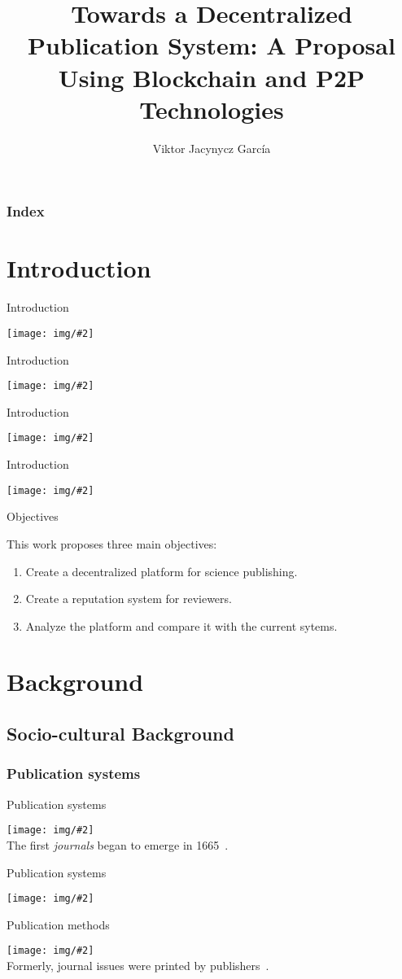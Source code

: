 \documentclass{beamer}
\title[Towards a Decentralized Publication System]{\large{Towards a Decentralized Publication System: A Proposal Using Blockchain and P2P Technologies}}
\author[V. Jacynycz]{Viktor Jacynycz García}
\institute[UCM] %
{
  Máster en ingeniería informática \\
  Master’s degree in Computer Science Engineering \\
  Facultad de informática\\
  Universidad Complutense de Madrid \\ %
  \medskip
  \textit{vsjg@ucm.es} %
}
\date{} %
\newcommand{\frameitc}[4]{
  \begin{frame}{#1}
    \begin{center}
      \texttt{[image: img/\#2]}\\
      #3~\cite{#4}.
    \end{center}
  \end{frame}
}
\newcommand{\framei}[2]{
  \begin{frame}{#1}
    \begin{center}
      \texttt{[image: img/\#2]}
    \end{center}
  \end{frame}
}
\newcommand{\framet}[2]{
  \begin{frame}{#1}
    #2
  \end{frame}
}
\begin{document}
\begin{frame}
\titlepage %
\end{frame}

\begin{frame}
\frametitle{Index}
    \begin{minipage}{0.7\textwidth}
       \linespread{1.1}
       \tableofcontents[hideallsubsections] 
       \vspace{10mm}
    \end{minipage}
\end{frame}

\section{Introduction}
\framei{Introduction}{Research_Journals.jpg}
\framei{Introduction}{publishers_logos.png}
\framei{Introduction}{ScientificReview.jpg}
\framei{Introduction}{decsci.jpg}

\framet{Objectives}{
This work proposes three main objectives:
\vspace{5mm}
\begin{enumerate}
    \item Create a decentralized platform for science publishing.
    \vspace{5mm}
    \item Create a reputation system for reviewers.
    \vspace{5mm}
    \item Analyze the platform and compare it with the current sytems.
\end{enumerate}
}


\section{Background}
\subsection{Socio-cultural Background}
\subsubsection{Publication systems}
\frameitc{Publication systems}{Philosophical_Transactions_Volume_1_frontispiece.jpg}{The first \emph{journals} began to emerge in 1665}{kronick1976history}
\framei{Publication systems}{publishers.PNG}

\frameitc{Publication methods}{publishing.png}{Formerly, journal issues were printed by publishers}{spier2002history}
\end{document}
